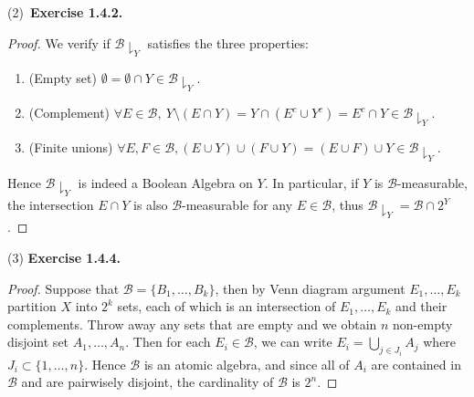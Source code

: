 \documentclass[a4paper]{article}
\begin{document}
(2)\ {\bfseries Exercise 1.4.2.}\begin{proof}
We verify if $\mathcal{B} \downharpoonright_Y$ satisfies the three properties: \begin{enumerate}[label = (\roman*)]
    \item (Empty set) $\emptyset = \emptyset \cap Y \in \mathcal{B} \downharpoonright_Y$.
    \item (Complement) $\forall E \in \mathcal{B},\ Y \setminus (E \cap Y) = Y \cap (E^c \cup Y^c) = 
    E^c \cap Y \in \mathcal{B} \downharpoonright_Y$.
    \item (Finite unions) $\forall E, F \in \mathcal{B}, (E \cup Y) \cup (F \cup Y) = (E \cup F) \cup Y 
    \in \mathcal{B} \downharpoonright_Y$.
\end{enumerate}
Hence $\mathcal{B} \downharpoonright_Y$ is indeed a Boolean Algebra on $Y$. In particular, if $Y$ is 
$\mathcal{B}$-measurable, the intersection $E \cap Y$ is also $\mathcal{B}$-measurable for any $E \in \mathcal{B}$, thus
$\mathcal{B} \downharpoonright_Y = \mathcal{B} \cap 2^Y$.
\end{proof}

(3) {\bfseries Exercise 1.4.4.}\begin{proof}
Suppose that $\mathcal{B} = \{B_1, \dots, B_k\}$, then by Venn diagram argument $E_1, \dots, E_k$ partition $X$ 
into $2^k$ sets, each of which is an intersection of $E_1, \dots, E_k$ and their complements. Throw away any sets 
that are empty and we obtain $n$ non-empty disjoint set $A_1, \dots, A_n$. Then for each $E_i \in \mathcal{B}$, 
we can write $E_i = \bigcup_{j \in J_i} A_j$ where $J_i \subset \{1, \dots, n\}$. Hence $\mathcal{B}$ is an atomic 
algebra, and since all of $A_i$ are contained in $\mathcal{B}$ and are pairwisely disjoint, the cardinality of $\mathcal{B}$
is $2^n$.
\end{proof}
\end{document}
